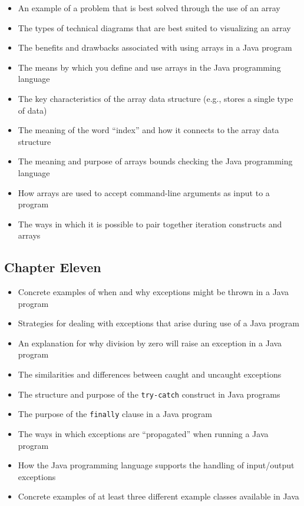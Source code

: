 \begin{itemize}

  \itemsep -.015in
  \item An example of a problem that is best solved through the use of an array
  \item The types of technical diagrams that are best suited to visualizing an array
  \item The benefits and drawbacks associated with using arrays in a Java program
  \item The means by which you define and use arrays in the Java programming language
  \item The key characteristics of the array data structure (e.g., stores a single type of data)
  \item The meaning of the word ``index'' and how it connects to the array data structure
  \item The meaning and purpose of arrays bounds checking the Java programming language
  \item How arrays are used to accept command-line arguments as input to a program
  \item The ways in which it is possible to pair together iteration constructs and arrays

\end{itemize}

\vspace*{-.2in}
\subsection*{Chapter Eleven}
\vspace*{-.05in}

\begin{itemize}

  \itemsep -.015in
  \item Concrete examples of when and why exceptions might be thrown in a Java program
  \item Strategies for dealing with exceptions that arise during use of a Java program
  \item An explanation for why division by zero will raise an exception in a Java program
  \item The similarities and differences between caught and uncaught exceptions
  \item The structure and purpose of the {\tt try-catch} construct in Java programs
  \item The purpose of the {\tt finally} clause in a Java program
  \item The ways in which exceptions are ``propagated'' when running a Java program
  \item How the Java programming language supports the handling of input/output exceptions
  \item Concrete examples of at least three different example classes available in Java

\end{itemize}


